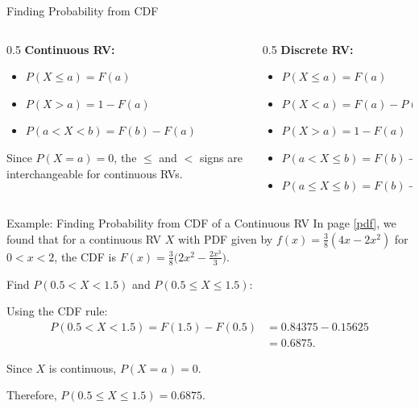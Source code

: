 \documentclass[12pt, aspectratio=169]{beamer}
\begin{document}
	\begin{frame}{Finding Probability from CDF}
		\begin{columns}
			\begin{column}{0.5\textwidth}
				\textbf{Continuous RV:}
				\begin{itemize}
					\item $P(X \leqslant a) = F(a)$
					\item $P(X > a) = 1 - F(a)$
					\item $P(a < X < b) = F(b) - F(a)$
				\end{itemize}

				\vspace{0.5em}
				{\small Since $P(X=a)=0$, the $\leqslant$ and $<$ signs are interchangeable for continuous RVs.}
			\end{column}

			\begin{column}{0.5\textwidth}
				\textbf{Discrete RV:}
				\begin{itemize}
					\item \(P(X \leqslant a) = F(a)\)
					\item \(P(X < a) = F(a) - P(X = a)\)
					\item \( P(X > a) = 1 - F(a)\)
					\item \(P(a < X \leqslant b) = F(b) - F(a)\)
					\item \(P(a \leqslant X \leqslant b) = F(b) - F(a) + P(X = a)\)
				\end{itemize}
			\end{column}
		\end{columns}
	\end{frame}


	\begin{frame}{Example: Finding Probability from CDF of a Continuous RV}
		In page \ref{pdf}, we found that for a continuous RV $X$ with PDF given by \(f(x) = \frac{3}{8}(4x-2x^2)\) for \(0 < x < 2\), the CDF is \(F(x) = \frac{3}{8}\big(2x^2 - \frac{2x^3}{3}\big)\).

		\vspace{0.5em}
		
		Find \(P(0.5 < X < 1.5)\) and \(P(0.5 \leqslant X \leqslant 1.5)\):

		\vspace{0.5em}

		Using the CDF rule:
		\begin{align*}
			P(0.5 < X < 1.5) = F(1.5) - F(0.5) &= 0.84375 - 0.15625 \\
			&= 0.6875.
		\end{align*}

		Since \(X\) is continuous, \(P(X=a)=0\).

		\vspace{0.5em}

		Therefore, \(P(0.5 \leqslant X \leqslant 1.5) = 0.6875\).
	\end{frame}
\end{document}
